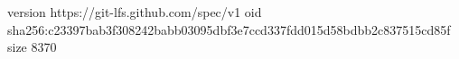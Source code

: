 version https://git-lfs.github.com/spec/v1
oid sha256:c23397bab3f308242babb03095dbf3e7ccd337fdd015d58bdbb2c837515cd85f
size 8370
